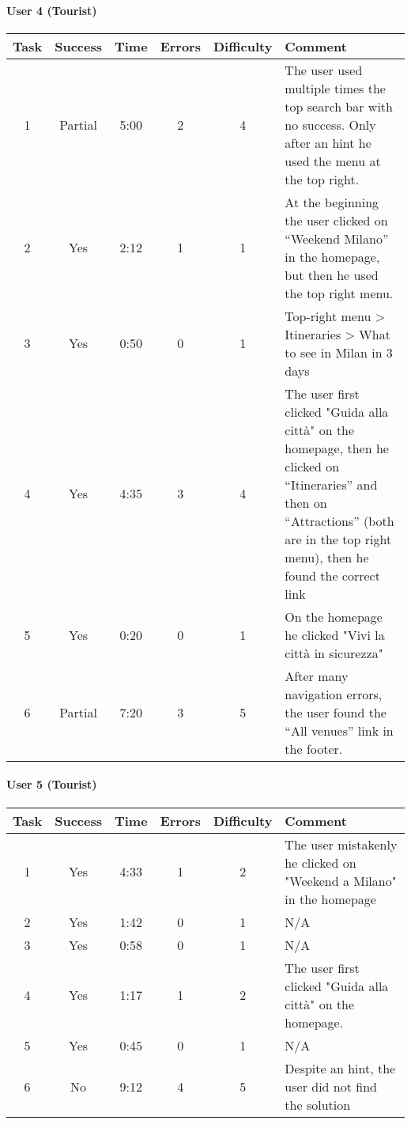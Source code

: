 \begin{small}
\paragraph{User 4 (Tourist)}
\begin{tabularx}{\linewidth}{c c c c c X}
    \toprule
    \textbf{Task} & \textbf{Success} & \textbf{Time}
     & \textbf{Errors} & \textbf{Difficulty} & \textbf{Comment} \\
    \midrule
    1 & Partial & 5:00 & 2 & 4 & The user used multiple times the top search bar with no success. Only after an hint he used the menu at the top right. \\ \midrule
    2 & Yes & 2:12 & 1 & 1 & At the beginning the user clicked on ``Weekend Milano'' in the homepage, but then he used the top right menu.  \\ \midrule
    3 & Yes & 0:50 & 0 & 1 & Top-right menu > Itineraries > What to see in Milan in 3 days \\ \midrule
    4 & Yes & 4:35 & 3 & 4 & The user first clicked "Guida alla citt\`a" on the homepage, then he clicked on ``Itineraries'' and then on ``Attractions'' (both are in the top right menu), then he found the correct link \\ \midrule
    5 & Yes & 0:20 & 0 & 1 & On the homepage he clicked "Vivi la citt\`a in sicurezza" \\ \midrule
    6 & Partial & 7:20 & 3 & 5 & After many navigation errors, the user found the ``All venues'' link in the footer. \\ \bottomrule
\end{tabularx}

\paragraph{User 5 (Tourist)}
\begin{tabularx}{\linewidth}{c c c c c X}
    \toprule
    \textbf{Task} & \textbf{Success} & \textbf{Time}
     & \textbf{Errors} & \textbf{Difficulty} & \textbf{Comment} \\
    \midrule
    1 & Yes & 4:33 & 1 & 2 & The user mistakenly he clicked on "Weekend a Milano" in the homepage \\ \midrule
    2 & Yes & 1:42 & 0 & 1 & N/A \\ \midrule
    3 & Yes & 0:58 & 0 & 1 & N/A \\ \midrule
    4 & Yes & 1:17 & 1 & 2 & The user first clicked "Guida alla citt\`a" on the homepage. \\ \midrule
    5 & Yes & 0:45 & 0 & 1 & N/A \\ \midrule
    6 & No & 9:12 & 4 & 5 & Despite an hint, the user did not find the solution \\ \bottomrule
\end{tabularx}

\end{small}
